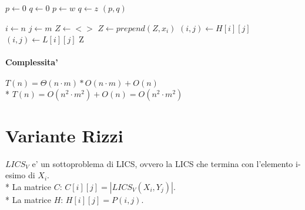 \begin{algorithm}
    \begin{algorithmic}
            \State $p \gets 0$
            \State $q \gets 0$
                        \State $p \gets w$
                        \State $q \gets z$
                    \EndIf
                \EndFor
            \EndFor
            \State \Return $(p,q)$
        \EndProcedure
    \end{algorithmic}
\end{algorithm}

\begin{algorithm}
    \begin{algorithmic}
            \State $i \gets n$
            \State $j \gets m$
            \State $Z \gets <>$
                    \State $Z \gets prepend(Z, x_i)$
                    \State $(i,j) \gets H[i][j]$
                \Else
                    \State $(i,j) \gets L[i][j]$
                \EndIf
            \EndWhile
            \State \Return Z
        \EndProcedure
    \end{algorithmic}
\end{algorithm}

\paragraph{Complessita'}
$T(n) = \Theta(n \cdot m) * O(n \cdot m) + O(n)$ \\*
$T(n) = O(n^2 \cdot m^2) + O(n) = O(n^2 \cdot m^2)$

\newpage

\section{Variante Rizzi}

$LICS_V$ e' un sottoproblema di LICS, ovvero la LICS che termina con l'elemento i-esimo di $X_i$. \\*
La matrice $C$: $C[i][j] = |LICS_V(X_i, Y_j)|$. \\*
La matrice $H$: $H[i][j] = P(i, j)$. \\

